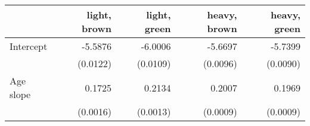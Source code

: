 \begin{tabular}{lrrrr} 
\toprule 
                                & light, brown   & light, green   & heavy, brown   & heavy, green  \\ 
\midrule 
                     Intercept  &      -5.5876   &      -6.0006   &      -5.6697   &      -5.7399  \\ 
                                & (0.0122)   & (0.0109)   & (0.0096)   & (0.0090)  \\ 
                     Age slope  &       0.1725   &       0.2134   &       0.2007   &       0.1969  \\ 
                                & (0.0016)   & (0.0013)   & (0.0009)   & (0.0009)  \\ 
\bottomrule \end{tabular} 
